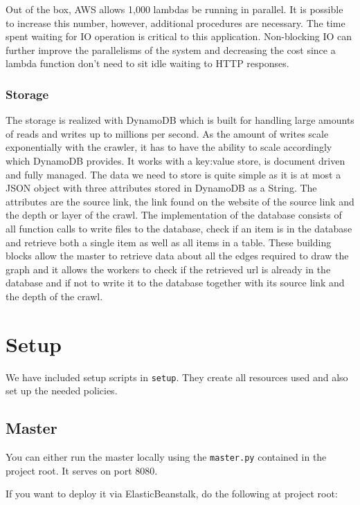 \documentclass[english]{scrartcl}
\begin{document}
Out of the box, AWS allows 1,000 lambdas be running in parallel. It is possible to increase this number, however, additional procedures are necessary. The time spent waiting for IO operation is critical to this application. Non-blocking IO can further improve the parallelisms of the system and decreasing the cost since a lambda function don't need to sit idle waiting to HTTP responses.

\subsubsection{Storage}

The storage is realized with DynamoDB which is built for handling large amounts of reads and writes up to millions per second.
As the amount of writes scale exponentially with the crawler, it has to have the ability to scale accordingly which DynamoDB provides.
It works with a key:value store, is document driven and fully managed.
The data we need to store is quite simple as it is at most a JSON object with three attributes stored in DynamoDB as a String.
The attributes are the source link, the link found on the website of the source link and the depth or layer of the crawl.
The implementation of the database consists of all function calls to write files to the database, check if an item is in the database and
retrieve both a single item as well as all items in a table. These building blocks allow the master to retrieve data about all the edges
required to draw the graph and it allows the workers to check if the retrieved url is already in the database and if not to write it to the
database together with its source link and the depth of the crawl.

\section{Setup}

We have included setup scripts in \texttt{setup}. They create all resources
used and also set up the needed policies. %

\subsection{Master}

You can either run the master locally using the \texttt{master.py} contained
in the project root. It serves on port 8080.

If you want to deploy it via ElasticBeanstalk, do the following at project
root:
\end{document}
